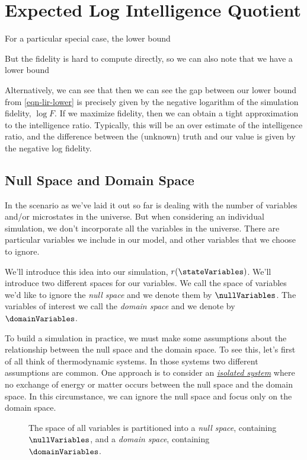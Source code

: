 \section{Expected Log Intelligence Quotient}

For a particular special case, the lower bound 

But the fidelity is hard to compute directly, so we can also note that we have a lower bound 

Alternatively, we can see that 
then we can see the gap between our lower bound from \ref{eqn-lir-lower} is precisely given by the negative logarithm of the simulation fidelity, $\log F$. If we maximize fidelity, then we can obtain a tight approximation to the intelligence ratio. Typically, this will be an over estimate of the intelligence ratio, and the difference between the (unknown) truth and our value is given by the negative log fidelity. 

\subsection{Null Space and Domain Space}

In the scenario as we've laid it out so far is dealing with the number of variables and/or microstates in the universe. But when considering an individual simulation, we don't incorporate all the variables in the universe. There are particular variables we include in our model, and other variables that we choose to ignore. 

We'll introduce this idea into our simulation, $r(\stateVariables)$. We'll introduce two different spaces for our variables. We call the space of variables we'd like to ignore the \emph{null space} and we denote them by $\nullVariables$. The variables of interest we call the \emph{domain space} and we denote by $\domainVariables$.

To build a simulation in practice, we must make some assumptions about the relationship between the null space and the domain space. To see this, let's first of all think of thermodynamic systems. In those systems two different assumptions are common. One approach is to consider an 
\href{https://en.wikipedia.org/wiki/Isolated_system}{\emph{isolated
system}} where no exchange of energy or matter occurs between the null
space and the domain space. In this circumstance, we can ignore the null space and focus only on the domain space. 

\begin{figure}
\caption{The space of all variables is partitioned into a \emph{null space}, containing $\nullVariables$, and a \emph{domain space}, containing $\domainVariables$.}
\end{figure}


